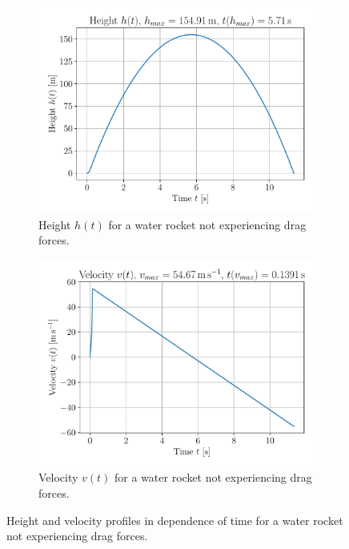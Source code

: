 \documentclass[a4paper,11pt]{report}
\begin{document}
\begin{figure}[h]
	\begin{subfigure}{0.49\textwidth}
		\centering
		\includegraphics[width=\textwidth]{figures/h(t)_without_drag.pdf}
		\caption{Height $h(t)$ for a water rocket not experiencing drag forces.}
		\label{fig:h(t)_without_drag}
	\end{subfigure} \hfill
	\begin{subfigure}{0.49\textwidth}
		\centering
		\includegraphics[width=\textwidth]{figures/v(t)_without_drag.pdf}
		\caption{Velocity $v(t)$ for a water rocket not experiencing drag forces.}
		\label{fig:v(t)_without_drag}
	\end{subfigure}
	\caption{Height and velocity profiles in dependence of time for a water rocket not experiencing drag forces.}
	\label{fig:results1_without_drag}
\end{figure}
\end{document}
